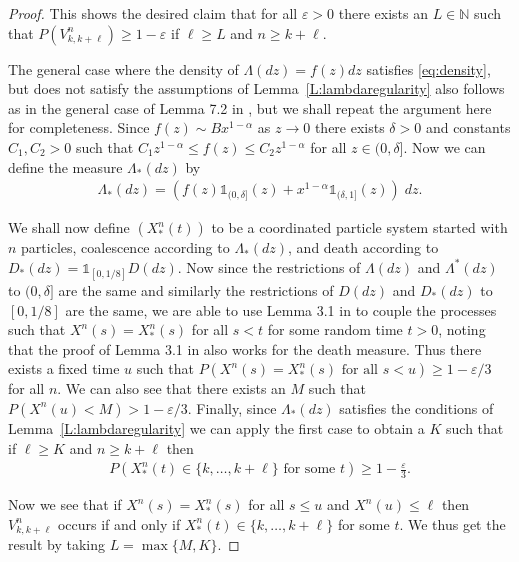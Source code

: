 \documentclass[11pt]{article}
\theoremstyle{definition}
\newcommand{\N}{\mathbb{N}}
\newcommand{\lemref}[1]{Lemma~\ref{L:#1}}
\begin{document}
\begin{proof}
    \noindent This shows the desired claim that for all $\varepsilon > 0$ there exists an $L \in \N$ such that $P(V_{k, k+\ell}^n) \geq 1 - \varepsilon$ if $\ell \geq L$ and $n \geq k + \ell$.
    \medskip

    \noindent The general case where the density of $\Lambda(dz) = f(z)dz$ satisfies \eqref{eq:density}, but does not satisfy the assumptions of \lemref{lambdaregularity} also follows as in the general case of Lemma 7.2 in \cite{betasmalltime}, but we shall repeat the argument here for completeness. Since $f(z) \sim Bx^{1-\alpha}$ as $z \to 0$ there exists $\delta > 0$ and constants $C_1, C_2 > 0$ such that $C_1z^{1-\alpha} \leq f(z) \leq C_2z^{1-\alpha}$ for all $z \in (0, \delta]$. Now we can define the measure $\Lambda_*(dz)$ by
    \begin{align*}
        \Lambda_*(dz) = (f(z)\mathds{1}_{(0, \delta]}(z) + x^{1-\alpha}\mathds{1}_{(\delta, 1]}(z))\;dz.
    \end{align*}

    \noindent We shall now define $(X_*^n(t))$ to be a coordinated particle system started with $n$ particles, coalescence according to $\Lambda_*(dz)$, and death according to $D_*(dz) = \mathds{1}_{[0,1/8]}D(dz)$. Now since the restrictions of $\Lambda(dz)$ and $\Lambda^*(dz)$ to $(0, \delta]$ are the same and similarly the restrictions of $D(dz)$ and $D_*(dz)$ to $[0,1/8]$ are the same, we are able to use Lemma 3.1 in \cite{betasmalltime} to couple the processes such that $X^n(s) = X^n_*(s)$ for all $s < t$ for some random time $t > 0$, noting that the proof of Lemma 3.1 in \cite{betasmalltime} also works for the death measure. Thus there exists a fixed time $u$ such that $P(X^n(s) = X^n_*(s) \text{ for all } s < u) \geq 1 - \varepsilon/3$ for all $n$. We can also see that there exists an $M$ such that $P(X^n(u) < M) > 1 - \varepsilon/3$. Finally, since $\Lambda_*(dz)$ satisfies the conditions of \lemref{lambdaregularity} we can apply the first case to obtain a $K$ such that if $\ell \geq K$ and $n \geq k+ \ell$ then 
    \begin{align*}
        P(X^n_*(t) \in \{k, \ldots, k+ \ell\} \text{ for some } t) \geq 1 - \frac{\varepsilon}{3}.
    \end{align*}

    \noindent Now we see that if $X^n(s) = X^n_*(s)$ for all $s \leq u$ and $X^n(u) \leq \ell$ then $V^n_{k,k+\ell}$ occurs if and only if $X^n_*(t) \in \{k, \ldots, k+ \ell\}$ for some $t$. We thus get the result by taking $L = \max\{M,K\}$.
\end{proof}
\end{document}
